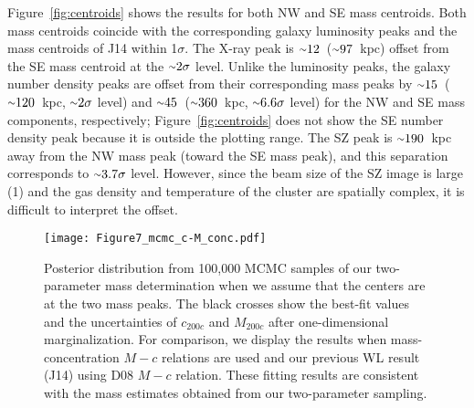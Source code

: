 \documentclass[twocolumn]{aastex631}
\newcommand{\mytilde}{\raise.19ex\hbox{$\scriptstyle\sim$}}
\begin{document}
Figure~\ref{fig:centroids} shows the results for both NW and SE mass centroids. 
Both mass centroids coincide with the corresponding galaxy luminosity peaks and the mass centroids of J14 within 1$\sigma$. 
The X-ray peak is $\mytilde12$\arcsec~($\mytilde97$~kpc) offset from the SE mass centroid at the $\mytilde2\sigma$ level. 
Unlike the luminosity peaks, the galaxy number density peaks are offset from their corresponding mass peaks by $\mytilde15$\arcsec~($\mytilde120$~kpc, $\mytilde2\sigma$ level) and $\mytilde45$\arcsec~($\mytilde360$~kpc, $\mytilde6.6\sigma$ level) for the NW and SE mass components, respectively; Figure~\ref{fig:centroids} does not show the SE number density peak because it is outside the plotting range. 
The SZ peak \citep{Marriage2011} is $\mytilde190$~kpc away from the NW mass peak (toward the SE mass peak), and this separation corresponds to $\mytilde3.7\sigma$ level. However, since the beam size of the SZ image is large (1) and the gas density and temperature of the cluster are spatially complex, it is difficult to interpret the offset. 



\begin{figure}
\centering
\texttt{[image: Figure7\_mcmc\_c-M\_conc.pdf]}
\caption{Posterior distribution from 100,000 MCMC samples of our two-parameter mass determination when we assume that the centers are at the two mass peaks. The black crosses show the best-fit values and the uncertainties of $c_{200c}$ and $M_{200c}$ after one-dimensional marginalization. 
For comparison, we display the results when mass-concentration $M-c$ relations are used and our previous WL result (J14) using D08 $M-c$ relation. 
These fitting results are consistent with the mass estimates obtained from our two-parameter sampling.}
\label{fig:MCMC_figs}
\end{figure}
\end{document}
